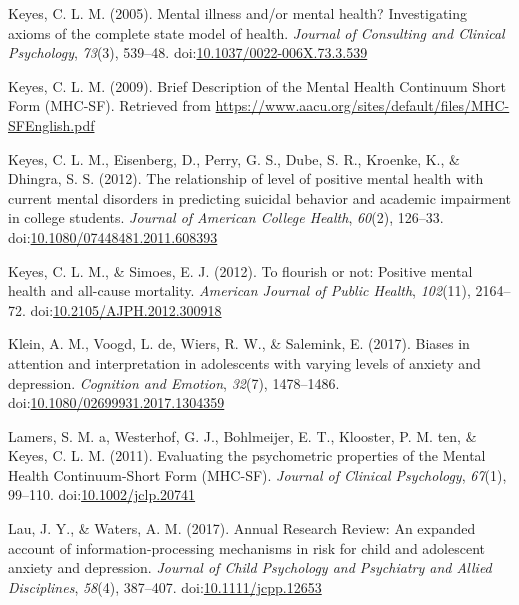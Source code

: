 \documentclass[man,floatsintext]{apa6}
\begin{document}
\leavevmode\hypertarget{ref-Keyes2005}{}%
Keyes, C. L. M. (2005). Mental illness and/or mental health? Investigating axioms of the complete state model of health. \emph{Journal of Consulting and Clinical Psychology}, \emph{73}(3), 539--48. doi:\href{https://doi.org/10.1037/0022-006X.73.3.539}{10.1037/0022-006X.73.3.539}

\leavevmode\hypertarget{ref-Keyes2009}{}%
Keyes, C. L. M. (2009). Brief Description of the Mental Health Continuum Short Form (MHC-SF). Retrieved from \url{https://www.aacu.org/sites/default/files/MHC-SFEnglish.pdf}

\leavevmode\hypertarget{ref-Keyes2012a}{}%
Keyes, C. L. M., Eisenberg, D., Perry, G. S., Dube, S. R., Kroenke, K., \& Dhingra, S. S. (2012). The relationship of level of positive mental health with current mental disorders in predicting suicidal behavior and academic impairment in college students. \emph{Journal of American College Health}, \emph{60}(2), 126--33. doi:\href{https://doi.org/10.1080/07448481.2011.608393}{10.1080/07448481.2011.608393}

\leavevmode\hypertarget{ref-Keyes2012}{}%
Keyes, C. L. M., \& Simoes, E. J. (2012). To flourish or not: Positive mental health and all-cause mortality. \emph{American Journal of Public Health}, \emph{102}(11), 2164--72. doi:\href{https://doi.org/10.2105/AJPH.2012.300918}{10.2105/AJPH.2012.300918}

\leavevmode\hypertarget{ref-klein_biases_2017}{}%
Klein, A. M., Voogd, L. de, Wiers, R. W., \& Salemink, E. (2017). Biases in attention and interpretation in adolescents with varying levels of anxiety and depression. \emph{Cognition and Emotion}, \emph{32}(7), 1478--1486. doi:\href{https://doi.org/10.1080/02699931.2017.1304359}{10.1080/02699931.2017.1304359}

\leavevmode\hypertarget{ref-Lamers2011}{}%
Lamers, S. M. a, Westerhof, G. J., Bohlmeijer, E. T., Klooster, P. M. ten, \& Keyes, C. L. M. (2011). Evaluating the psychometric properties of the Mental Health Continuum-Short Form (MHC-SF). \emph{Journal of Clinical Psychology}, \emph{67}(1), 99--110. doi:\href{https://doi.org/10.1002/jclp.20741}{10.1002/jclp.20741}

\leavevmode\hypertarget{ref-lau_annual_2017}{}%
Lau, J. Y., \& Waters, A. M. (2017). Annual Research Review: An expanded account of information-processing mechanisms in risk for child and adolescent anxiety and depression. \emph{Journal of Child Psychology and Psychiatry and Allied Disciplines}, \emph{58}(4), 387--407. doi:\href{https://doi.org/10.1111/jcpp.12653}{10.1111/jcpp.12653}
\end{document}
